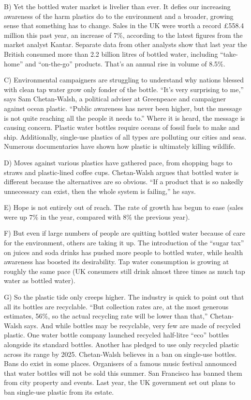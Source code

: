 \documentclass[UTF8,11pt]{ctexart}
\begin{document}
B) Yet the bottled water market is livelier than ever. It defies our increasing awareness of the harm plastics do to the environment and a broader, growing sense that something has to change. Sales in the UK were worth a record £558.4 million this past year, an increase of 7\%, according to the latest figures from the market analyst Kantar. Separate data from other analysts show that last year the British consumed more than 2.2 billion litres of bottled water, including “take-home” and “on-the-go” products. That’s an annual rise in volume of 8.5\%.


C) Environmental campaigners are struggling to understand why nations blessed with clean tap water grow only fonder of the bottle. “It’s very surprising to me,” says Sam Chetan-Walsh, a political adviser at Greenpeace and campaigner against ocean plastic. “Public awareness has never been higher, but the message is not quite reaching all the people it needs to.” Where it is heard, the message is causing concern. Plastic water bottles require oceans of fossil fuels to make and ship. Additionally, single-use plastics of all types are polluting our cities and seas. Numerous documentaries have shown how plastic is ultimately killing wildlife.


D) Moves against various plastics have gathered pace, from shopping bags to straws and plastic-lined coffee cups. Chetan-Walsh argues that bottled water is different because the alternatives are so obvious. “If a product that is so nakedly unnecessary can exist, then the whole system is failing,” he says.


E) Hope is not entirely out of reach. The rate of growth has begun to ease (sales were up 7\% in the year, compared with 8\% the previous year).


F) But even if large numbers of people are quitting bottled water because of care for the environment, others are taking it up. The introduction of the “sugar tax” on juices and soda drinks has pushed more people to bottled water, while health awareness has boosted its desirability. Tap water consumption is growing at roughly the same pace (UK consumers still drink almost three times as much tap water as bottled water).


G) So the plastic tide only creeps higher. The industry is quick to point out that all its bottles are recyclable. “But collection rates are, at the most generous estimates, 56\%, so the actual recycling rate will be lower than that,” Chetan-Walsh says. And while bottles may be recyclable, very few are made of recycled plastic. One water bottle company launched recycled half-litre “eco” bottles alongside its standard bottles. Another has pledged to use only recycled plastic across its range by 2025. Chetan-Walsh believes in a ban on single-use bottles. Bans do exist in some places. Organisers of a famous music festival announced that water bottles will not be sold this summer. San Francisco has banned them from city property and events. Last year, the UK government set out plans to ban single-use plastic from its estate.
\end{document}
